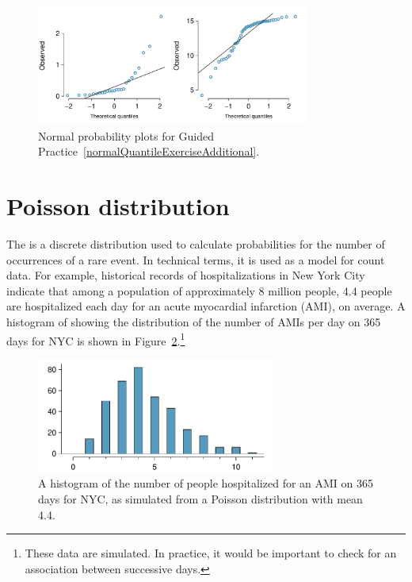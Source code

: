 \begin{figure}[h]
\centering
\includegraphics[width=0.80\textwidth]{ch_distributions_oi_biostat/figures/normalQuantileExer/normalQuantileExerAdditional}
\caption{Normal probability plots for Guided Practice~\ref{normalQuantileExerciseAdditional}.}
\label{normalQuantileExerAdditional}
\end{figure}




\section{Poisson distribution}
\label{poisson}


The  is a discrete distribution used to calculate probabilities for the number of occurrences of a rare event.  In technical terms, it is used as a model for count data. For example, historical records of hospitalizations in New York City indicate that among a population of approximately 8 million people, 4.4 people are hospitalized each day for an acute myocardial infarction (AMI), on average.  A histogram of showing the distribution of the number of AMIs per day on 365 days for NYC is shown in Figure~\ref{amiIncidencesOver100Days}.\footnote{These data are simulated. In practice, it would be important to check for an association between successive days.}

\begin{figure}[h]
	\centering
	\includegraphics[width=0.7\textwidth]{ch_distributions_oi_biostat/figures/amiIncidencesOver100Days/amiIncidencesOver100Days}
	\caption{A histogram of the number of people hospitalized for an AMI on 365 days for NYC, as simulated from a Poisson distribution with mean 4.4.}
	\label{amiIncidencesOver100Days}
\end{figure}


